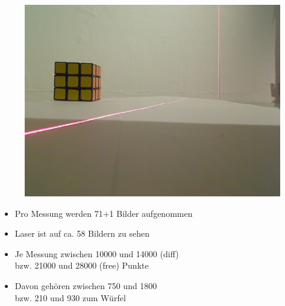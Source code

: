 \documentclass[xcolor=dvipsnames]{beamer}
\begin{document}
\begin{frame}
\begin{figure}
\begin{minipage}{0.32\linewidth}
		\end{minipage}
		\hfill
		\begin{minipage}{0.32\linewidth}
			\includegraphics[width=\linewidth]{includes/test_repeat_3}
		\end{minipage}
	\end{figure}
	
	\begin{itemize}
		\item Pro Messung werden 71+1 Bilder aufgenommen
		\item Laser ist auf ca. 58 Bildern zu sehen
		\item Je Messung zwischen 10000 und 14000 (diff) \\ bzw. 21000 und 28000 (free) Punkte
		\item Davon gehören zwischen 750 und 1800 \\ bzw. 210 und 930 zum Würfel
	\end{itemize}


\end{frame}
\end{document}
